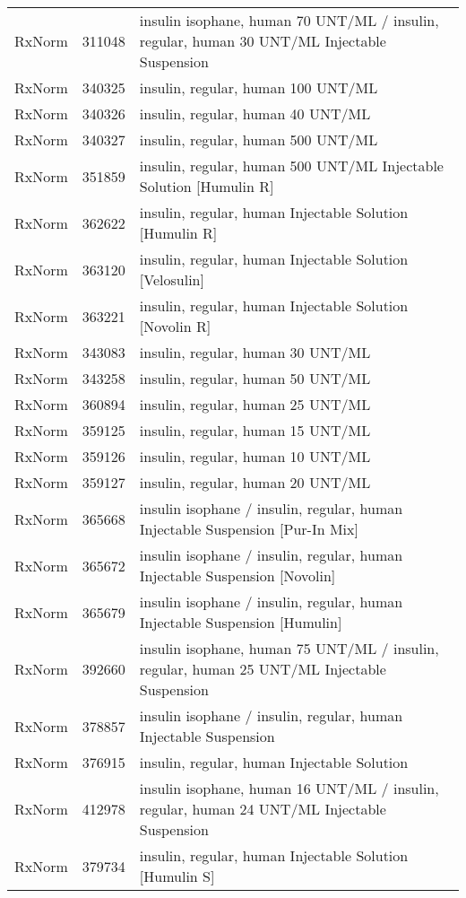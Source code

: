\begin{longtable}{p{}p{}p{}}
  RxNorm & 311048 & insulin isophane, human 70 UNT/ML / insulin, regular, human 30 UNT/ML Injectable Suspension \\ 
  RxNorm & 340325 & insulin, regular, human 100 UNT/ML \\ 
  RxNorm & 340326 & insulin, regular, human 40 UNT/ML \\ 
  RxNorm & 340327 & insulin, regular, human 500 UNT/ML \\ 
  RxNorm & 351859 & insulin, regular, human 500 UNT/ML Injectable Solution [Humulin R] \\ 
  RxNorm & 362622 & insulin, regular, human Injectable Solution [Humulin R] \\ 
  RxNorm & 363120 & insulin, regular, human Injectable Solution [Velosulin] \\ 
  RxNorm & 363221 & insulin, regular, human Injectable Solution [Novolin R] \\ 
  RxNorm & 343083 & insulin, regular, human 30 UNT/ML \\ 
  RxNorm & 343258 & insulin, regular, human 50 UNT/ML \\ 
  RxNorm & 360894 & insulin, regular, human 25 UNT/ML \\ 
  RxNorm & 359125 & insulin, regular, human 15 UNT/ML \\ 
  RxNorm & 359126 & insulin, regular, human 10 UNT/ML \\ 
  RxNorm & 359127 & insulin, regular, human 20 UNT/ML \\ 
  RxNorm & 365668 & insulin isophane / insulin, regular, human Injectable Suspension [Pur-In Mix] \\ 
  RxNorm & 365672 & insulin isophane / insulin, regular, human Injectable Suspension [Novolin] \\ 
  RxNorm & 365679 & insulin isophane / insulin, regular, human Injectable Suspension [Humulin] \\ 
  RxNorm & 392660 & insulin isophane, human 75 UNT/ML / insulin, regular, human 25 UNT/ML Injectable Suspension \\ 
  RxNorm & 378857 & insulin isophane / insulin, regular, human Injectable Suspension \\ 
  RxNorm & 376915 & insulin, regular, human Injectable Solution \\ 
  RxNorm & 412978 & insulin isophane, human 16 UNT/ML / insulin, regular, human 24 UNT/ML Injectable Suspension \\ 
  RxNorm & 379734 & insulin, regular, human Injectable Solution [Humulin S] \\ 

\end{longtable}
